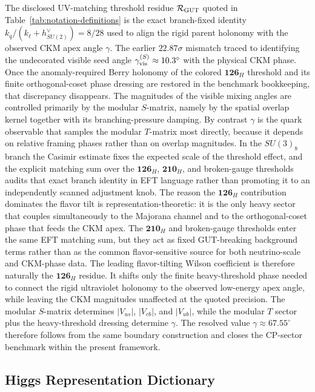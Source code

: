 \documentclass[11pt]{article}
\begin{document}
The disclosed UV-matching threshold residue $\mathcal R_{\rm GUT}$ quoted in Table~\ref{tab:notation-definitions} is the exact branch-fixed identity $k_q/(k_{\ell}+h^{\vee}_{SU(2)})=8/28$ used to align the rigid parent holonomy with the observed CKM apex angle $\gamma$. The earlier $22.87\sigma$ mismatch traced to identifying the undecorated visible seed angle $\gamma_{\rm vis}^{(S)}\approx10.3^{\circ}$ with the physical CKM phase. Once the anomaly-required Berry holonomy of the colored $\mathbf{126}_H$ threshold and its finite orthogonal-coset phase dressing are restored in the benchmark bookkeeping, that discrepancy disappears. The magnitudes of the visible mixing angles are controlled primarily by the modular $S$-matrix, namely by the spatial overlap kernel together with its branching-pressure damping. By contrast $\gamma$ is the quark observable that samples the modular $T$-matrix most directly, because it depends on relative framing phases rather than on overlap magnitudes. In the $SU(3)_8$ branch the Casimir estimate fixes the expected scale of the threshold effect, and the explicit matching sum over the $\mathbf{126}_H$, $\mathbf{210}_H$, and broken-gauge thresholds audits that exact branch identity in EFT language rather than promoting it to an independently scanned adjustment knob. The reason the $\mathbf{126}_H$ contribution dominates the flavor tilt is representation-theoretic: it is the only heavy sector that couples simultaneously to the Majorana channel and to the orthogonal-coset phase that feeds the CKM apex. The $\mathbf{210}_H$ and broken-gauge thresholds enter the same EFT matching sum, but they act as fixed GUT-breaking background terms rather than as the common flavor-sensitive source for both neutrino-scale and CKM-phase data. The leading flavor-tilting Wilson coefficient is therefore naturally the $\mathbf{126}_H$ residue. It shifts only the finite heavy-threshold phase needed to connect the rigid ultraviolet holonomy to the observed low-energy apex angle, while leaving the CKM magnitudes unaffected at the quoted precision. The modular $S$-matrix determines $|V_{us}|$, $|V_{cb}|$, and $|V_{ub}|$, while the modular $T$ sector plus the heavy-threshold dressing determine $\gamma$. The resolved value $\gamma\approx67.55^{\circ}$ therefore follows from the same boundary construction and closes the CP-sector benchmark within the present framework.

\subsection{Higgs Representation Dictionary}
\end{document}
